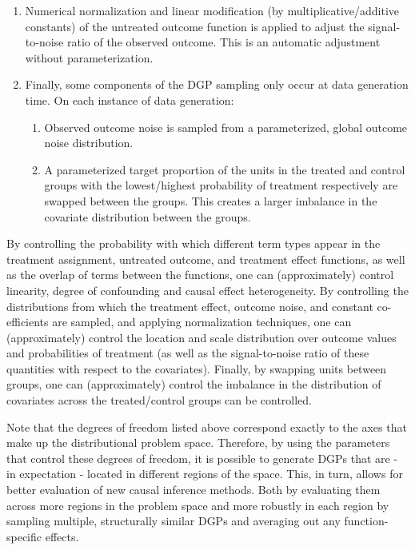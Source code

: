 \documentclass[../main.tex]{subfiles}
\begin{document}
\begin{enumerate}
    \item Numerical normalization and linear modification (by multiplicative/additive constants) of the untreated outcome function is applied to adjust the signal-to-noise ratio of the observed outcome. This is an automatic adjustment without parameterization.
    
    \item Finally, some components of the DGP sampling only occur at data generation time. On each instance of data generation:

    \begin{enumerate}
        \item Observed outcome noise is sampled from a parameterized, global outcome noise distribution.
        \item A parameterized target proportion of the units in the treated and control groups with the lowest/highest probability of treatment respectively are swapped between the groups. This creates a larger imbalance in the covariate distribution between the groups.
    \end{enumerate}
    
\end{enumerate}

By controlling the probability with which different term types appear in the treatment assignment, untreated outcome, and treatment effect functions, as well as the overlap of terms between the functions, one can (approximately) control linearity, degree of confounding and causal effect heterogeneity. By controlling the distributions from which the treatment effect, outcome noise, and constant co-efficients are sampled, and applying normalization techniques, one can (approximately) control the location and scale distribution over outcome values and probabilities of treatment (as well as the signal-to-noise ratio of these quantities with respect to the covariates). Finally, by swapping units between groups, one can (approximately) control the imbalance in the distribution of covariates across the treated/control groups can be controlled.

\vspace{\baselineskip}

Note that the degrees of freedom listed above correspond exactly to the axes that make up the distributional problem space. Therefore, by using the parameters that control these degrees of freedom, it is possible to generate DGPs that are - in expectation - located in different regions of the space. This, in turn, allows for better evaluation of new causal inference methods. Both by evaluating them across more regions in the problem space and more robustly in each region by sampling multiple, structurally similar DGPs and averaging out any function-specific effects.
\end{document}
